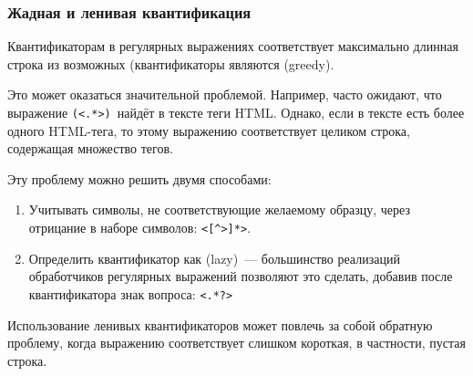 \subsubsection{Жадная и ленивая квантификация}

\begin{framed}
Квантификаторам в регулярных выражениях соответствует максимально длинная 
строка из возможных (квантификаторы являются  (greedy).
\end{framed} 

Это может оказаться значительной проблемой. Например, часто ожидают, что 
выражение \verb|(<.*>)|\ найдёт в тексте теги HTML. 
Однако, если в тексте есть более 
одного HTML-тега, то этому выражению соответствует целиком строка, содержащая 
множество тегов.

Эту проблему можно решить двумя способами:

\begin{enumerate}

\item Учитывать символы, не соответствующие желаемому образцу, через отрицание
в наборе символов: \verb|<[^>]*>|.

\item Определить квантификатор как  (lazy)\ --- 
большинство реализаций обработчиков регулярных выражений позволяют это
сделать, добавив после квантификатора знак вопроса: \verb|<.*?>|

\end{enumerate}

Использование ленивых квантификаторов может повлечь за собой обратную проблему,
когда выражению соответствует слишком короткая, в частности, пустая строка.

